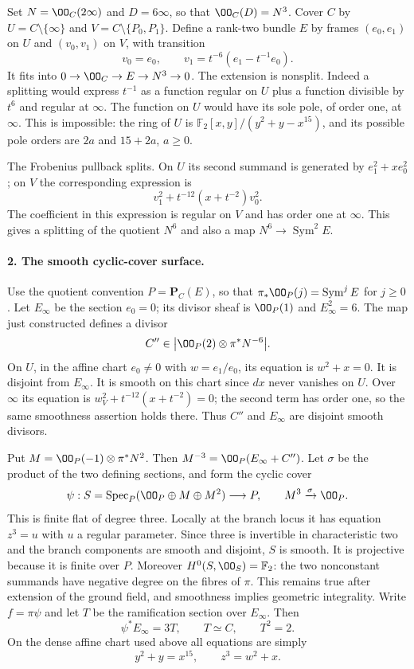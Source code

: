 Set $N=\OO_C(2\infty)$ and $D=6\infty$, so that
$\OO_C(D)=N^3$. Cover $C$ by
$U=C\setminus\{\infty\}$ and $V=C\setminus\{P_0,P_1\}$.
Define a rank-two bundle $E$ by frames $(e_0,e_1)$ on $U$ and
$(v_0,v_1)$ on $V$, with transition
\begin{equation}\label{a:explicit-transition}
 v_0=e_0,\qquad v_1=t^{-6}(e_1-t^{-1}e_0).
\end{equation}
It fits into $0\to\OO_C\to E\to N^3\to0$.
The extension is nonsplit. Indeed a splitting would express $t^{-1}$
as a function regular on $U$ plus a function divisible by $t^6$ and
regular at $\infty$. The function on $U$ would have its sole pole,
of order one, at $\infty$. This is impossible: the ring of $U$ is
$\mathbb F_2[x,y]/(y^2+y-x^{15})$, and its possible pole orders are
$2a$ and $15+2a$, $a\geq0$.

The Frobenius pullback splits. On $U$ its second summand is generated
by $e_1^2+xe_0^2$; on $V$ the corresponding expression is
\[
 v_1^2+t^{-12}(x+t^{-2})v_0^2.
\]
The coefficient in this expression is regular on $V$ and has order
one at $\infty$. This gives a splitting of the quotient $N^6$ and
also a map $N^6\to\operatorname{Sym}^2E$.

\paragraph{2. The smooth cyclic-cover surface.}
Use the quotient convention $P=\mathbf P_C(E)$, so that
$\pi_*\OO_P(j)=\operatorname{Sym}^jE$ for $j\geq0$.
Let $E_\infty$ be the section $e_0=0$; its divisor sheaf is
$\OO_P(1)$ and $E_\infty^2=6$. The map just constructed defines
a divisor
\[
 C''\in\big|\OO_P(2)\otimes\pi^*N^{-6}\big|.
\]
On $U$, in the affine chart $e_0\ne0$ with $w=e_1/e_0$, its
equation is $w^2+x=0$. It is disjoint from $E_\infty$.
It is smooth on this chart since $dx$ never vanishes on $U$.
Over $\infty$ its equation is
$w_V^2+t^{-12}(x+t^{-2})=0$; the second term has order one,
so the same smoothness assertion holds there. Thus $C''$ and
$E_\infty$ are disjoint smooth divisors.

Put $M=\OO_P(-1)\otimes\pi^*N^2$. Then
$M^{-3}=\OO_P(E_\infty+C'')$. Let $\sigma$ be the product of
the two defining sections, and form the cyclic cover
\[
 \psi:S=\operatorname{Spec}_P
       (\OO_P\oplus M\oplus M^2)\longrightarrow P,
 \qquad M^3\xrightarrow{\sigma}\OO_P.
\]
This is finite flat of degree three. Locally at the branch locus it
has equation $z^3=u$ with $u$ a regular parameter. Since three is
invertible in characteristic two and the branch components are smooth
and disjoint, $S$ is smooth. It is projective because it is finite over
$P$. Moreover $H^0(S,\OO_S)=\mathbb F_2$: the two nonconstant
summands have negative degree on the fibres of $\pi$. This remains
true after extension of the ground field, and smoothness implies
geometric integrality. Write $f=\pi\psi$ and let $T$ be the
ramification section over $E_\infty$. Then
\[
 \psi^*E_\infty=3T,\qquad T\simeq C,\qquad T^2=2.
\]
On the dense affine chart used above all equations are simply
\begin{equation}\label{a:surface-affine}
 y^2+y=x^{15},\qquad z^3=w^2+x.
\end{equation}

